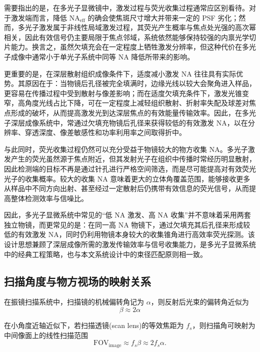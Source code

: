 需要指出的是，在多光子显微镜中，激发过程与荧光收集过程通常应区别看待。对于激发端而言，降低 $\mathrm{NA}_{\mathrm{eff}}$ 的确会使焦斑尺寸增大并带来一定的 PSF 劣化；然而，多光子激发属于非线性局域激发过程，其荧光产生概率与焦点处光强的高次幂相关，因此有效信号仍主要局限于焦点邻域，系统依然能够保持较强的内禀光学切片能力。换言之，虽然欠填充会在一定程度上牺牲激发分辨率，但这种代价在多光子成像中通常小于单光子系统中同等 NA 降低所带来的影响。

更重要的是，在深层散射组织成像条件下，适度减小激发 NA 往往具有实际优势\cite{RN372}。其原因在于：当物镜后孔径被完全填满时，边缘光线以较大会聚角进入样品，更容易在传播过程中受到散射与像差影响；而在适度欠填充条件下，激发光锥变窄，高角度光线占比下降，可在一定程度上减轻组织散射、折射率失配及球差对焦点形成的破坏，从而提高激发光到达深层焦点的有效能量传输效率。因此，在多光子深层成像系统中，常通过欠填充物镜后孔径来获得较低的有效激发 NA，以在分辨率、穿透深度、像差敏感性和功率利用率之间取得折中。

与此同时，荧光收集过程仍然可以充分受益于物镜较大的物方收集 NA。多光子激发产生的荧光虽然源于焦点附近，但其发射光子在组织中传播时常经历明显散射，因此检测端的目标不再是通过针孔进行严格空间筛选，而是尽可能提高对有效荧光光子的收集概率。较大的收集 NA 意味着更大的立体角覆盖范围，能够接收更多从样品中不同方向出射、甚至经过一定散射后仍携带有效信息的荧光信号，从而提高整体检测效率与信噪比。

因此，多光子显微系统中常见的``低 NA 激发、高 NA 收集''并不意味着采用两套独立物镜，而更常见的是：在同一高 NA 物镜下，通过欠填充其后孔径来形成较低的有效激发 NA，同时仍利用物镜本身较大的收集锥角进行高效率荧光探测。该设计思想兼顾了深层成像所需的激发传输效率与信号收集能力，是多光子显微系统中的经典工程策略，也与本文系统设计中的束径匹配原则相一致。




\subsection{扫描角度与物方视场的映射关系}\label{2.4.3}

在振镜扫描系统中，扫描镜的机械偏转角记为 $\alpha$，则反射后光束的偏转角近似为
\begin{equation}
  \beta \approx 2\alpha
  \label{eq:beta_alpha}
\end{equation}

在小角度近轴近似下，若扫描透镜(scan lens)的等效焦距为 $f_s$，则扫描角可映射为中间像面上的线性扫描范围
\begin{equation}
  \mathrm{FOV}_{\mathrm{image}}\approx f_s\beta \approx 2f_s\alpha.
  \label{eq:fov_image}
\end{equation}

